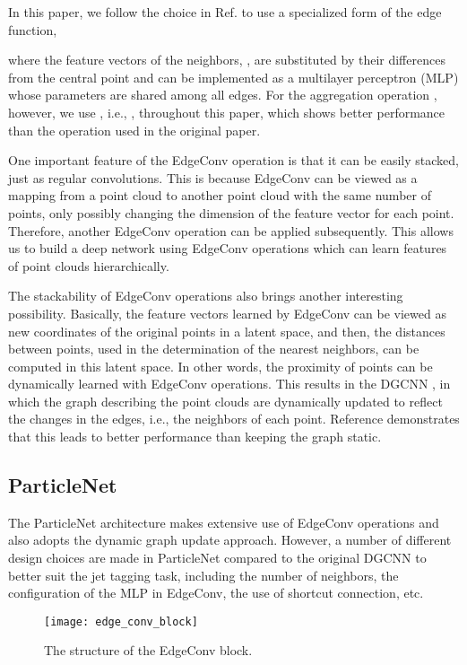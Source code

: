 \documentclass[aps,prd,longbibliography,reprint,amsmath,amssymb,amsfonts]{revtex4-1}
\begin{document}
In this paper, we follow the choice in Ref. \cite{DBLP:journals/corr/abs-1801-07829} to use a specialized form of the edge function,

where the feature vectors of the neighbors, , are substituted by their differences from the central point  and  can be implemented as a  multilayer perceptron (MLP) whose parameters are shared among all edges. For the aggregation operation , however, we use , i.e., , throughout this paper, which shows better performance than the  operation used in the original paper.

One important feature of the EdgeConv operation is that it can be easily stacked, just as regular convolutions. This is because EdgeConv can be viewed as a mapping from a point cloud to another point cloud with the same number of points, only possibly changing the dimension of the feature vector for each point. Therefore, another EdgeConv operation can be applied subsequently. This allows us to build a deep network using EdgeConv operations which can learn features of point clouds hierarchically.

The stackability of EdgeConv operations also brings another interesting possibility. Basically, the feature vectors learned by EdgeConv can be viewed as new coordinates of the original points in a latent space, and then, the distances between points, used in the determination of the  nearest neighbors, can be computed in this latent space. In other words, the proximity of points can be dynamically learned with EdgeConv operations. This results in the DGCNN \cite{DBLP:journals/corr/abs-1801-07829}, in which the graph describing the point clouds are dynamically updated to reflect the changes in the edges, i.e., the neighbors of each point. Reference \cite{DBLP:journals/corr/abs-1801-07829} demonstrates that this leads to better performance than keeping the graph static.

\subsection{ParticleNet}

The ParticleNet architecture makes extensive use of EdgeConv operations and also adopts the dynamic graph update approach. However, a number of different design choices are made in ParticleNet compared to the original DGCNN to better suit the jet tagging task, including the number of neighbors, the configuration of the MLP in EdgeConv, the use of shortcut connection, etc.

\begin{figure}[htbp]
\centering
\texttt{[image: edge\_conv\_block]}
\caption{The structure of the EdgeConv block.}
\label{fig:block}
\end{figure}
\end{document}
